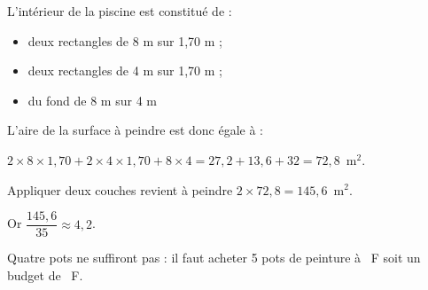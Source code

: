 
\medskip


%
%
%
%
%
%
L'intérieur de la piscine est constitué de :

\begin{itemize}
\item deux rectangles de 8 m  sur 1,70 m ;
\item deux rectangles de 4 m sur 1,70 m ;
\item du fond de 8 m sur 4 m
\end{itemize}

L'aire de la surface à peindre est donc égale à :

$2 \times 8 \times 1,70 + 2 \times 4 \times 1,70 + 8 \times 4 = 27,2 + 13,6 + 32 = 72,8$~m$^2$.

Appliquer deux couches revient à peindre $2 \times 72,8 = 145,6$~m$^2$.

Or $\dfrac{145,6}{35} \approx 4,2$.

Quatre pots ne suffiront pas : il faut acheter 5 pots de peinture à ~F soit un budget de ~F{}.

\bigskip

